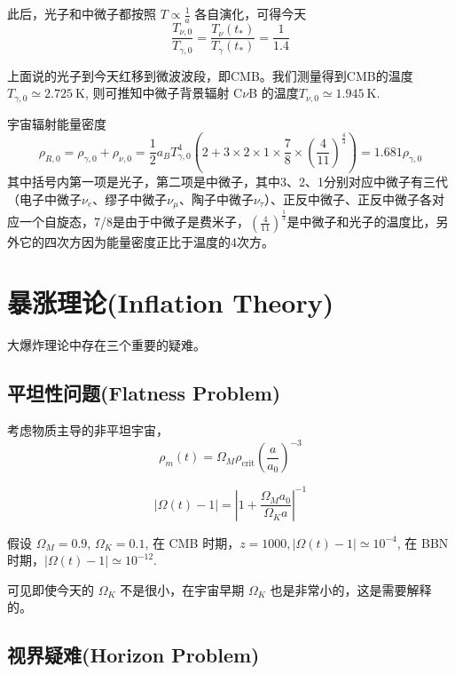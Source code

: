 \documentclass[12pt]{ctexart}
\begin{document}
此后，光子和中微子都按照 $T\propto \frac{1}{a}$ 各自演化，可得今天
\begin{equation}
    \frac{T_{\nu,0}}{T_{\gamma,0}} = \frac{T_\nu(t_*)}{T_\gamma(t_*)} = \frac{1}{1.4}
\end{equation}

上面说的光子到今天红移到微波波段，即CMB。我们测量得到CMB的温度 $T_{\gamma,0}\simeq 2.725 \mathrm{~K}$, 则可推知中微子背景辐射 C$\nu$B 的温度$T_{\nu,0} \simeq 1.945 \mathrm{~K}$.

宇宙辐射能量密度
\begin{equation}
    \rho_{R,0} = \rho_{\gamma,0} + \rho_{\nu,0} = \frac{1}{2} a_B T_{\gamma,0}^4 \left(2+ 3\times 2\times 1\times\frac{7}{8} \times \left(\frac{4}{11}\right)^\frac{4}{3} \right) = 1.681 \rho_{\gamma,0}
\end{equation}
其中括号内第一项是光子，第二项是中微子，其中3、2、1分别对应中微子有三代（电子中微子$\nu_e$、缪子中微子$\nu_\mu$、陶子中微子$\nu_\tau$）、正反中微子、正反中微子各对应一个自旋态，7/8是由于中微子是费米子，$\left(\frac{4}{11}\right)^\frac{1}{3}$是中微子和光子的温度比，另外它的四次方因为能量密度正比于温度的4次方。

\section{暴涨理论(Inflation Theory)}

大爆炸理论中存在三个重要的疑难。

\subsection{平坦性问题(Flatness Problem)}
考虑物质主导的非平坦宇宙，
\begin{equation}
    \rho_m(t) = \Omega_M \rho_\text{crit} \left( \frac{a}{a_0}\right)^{-3}
\end{equation}

\begin{equation}
    |\Omega(t)-1| = \left|1+\frac{\Omega_M a_0}{\Omega_K a}\right|^{-1}
\end{equation}
%

假设 $\Omega_M = 0.9$, $\Omega_K = 0.1$, 
在 CMB 时期，$z=1000,  |\Omega(t)-1|  \simeq 10^{-4}$,
在 BBN 时期，$ |\Omega(t)-1|  \simeq  10^{-12}$.

可见即使今天的 $\Omega_K$ 不是很小，在宇宙早期  $\Omega_K$ 也是非常小的，这是需要解释的。

\subsection{视界疑难(Horizon Problem)}
\end{document}
